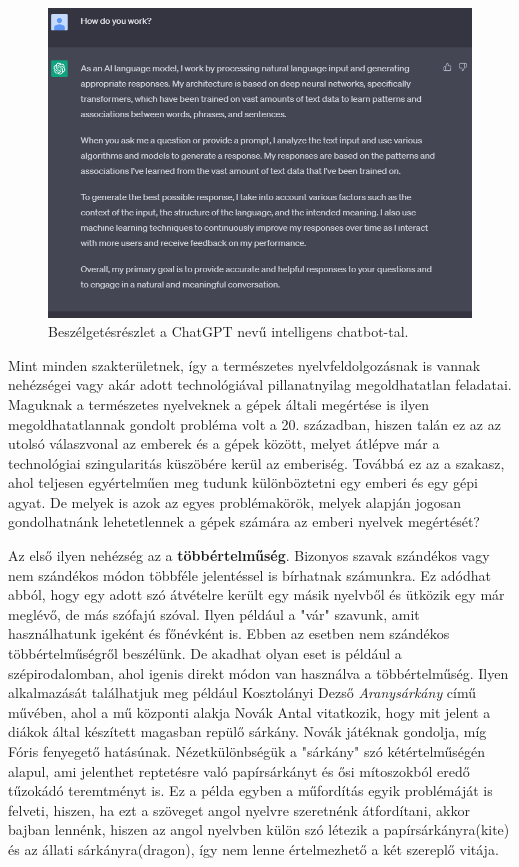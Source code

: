 \newpage

\begin{figure}[h]
\centering
\includegraphics[scale=0.6]{images/chatgpt.png}
\caption{Beszélgetésrészlet a ChatGPT nevű intelligens chatbot-tal.}
\label{fig:chatgpt}
\end{figure}


Mint minden szakterületnek, így a természetes nyelvfeldolgozásnak is vannak nehézségei vagy akár adott technológiával pillanatnyilag megoldhatatlan feladatai. Maguknak a természetes nyelveknek a gépek általi megértése is ilyen megoldhatatlannak gondolt probléma volt a 20. században, hiszen talán ez az az utolsó válaszvonal az emberek és a gépek között, melyet átlépve már a technológiai szingularitás küszöbére kerül az emberiség. Továbbá ez az a szakasz, ahol teljesen egyértelműen meg tudunk különböztetni egy emberi és egy gépi agyat. De melyek is azok az egyes problémakörök, melyek alapján jogosan gondolhatnánk lehetetlennek a gépek számára az emberi nyelvek megértését?

Az első ilyen nehézség az a \textbf{többértelműség}. Bizonyos szavak szándékos vagy nem szándékos módon többféle jelentéssel is bírhatnak számunkra. Ez adódhat abból, hogy egy adott szó átvételre került egy másik nyelvből és ütközik egy már meglévő, de más szófajú szóval. Ilyen például a "vár" szavunk, amit használhatunk igeként és főnévként is. Ebben az esetben nem szándékos többértelműségről beszélünk. De akadhat olyan eset is például a szépirodalomban, ahol igenis direkt módon van használva a többértelműség. Ilyen alkalmazását találhatjuk meg például Kosztolányi Dezső \textit{Aranysárkány} című művében, ahol a mű központi alakja Novák Antal vitatkozik, hogy mit jelent a diákok által készített magasban repülő sárkány. Novák játéknak gondolja, míg Fóris fenyegető hatásúnak. Nézetkülönbségük a "sárkány" szó kétértelműségén alapul, ami jelenthet reptetésre való papírsárkányt és ősi mítoszokból eredő tűzokádó teremtményt is. Ez a példa egyben a műfordítás egyik problémáját is felveti, hiszen, ha ezt a szöveget angol nyelvre szeretnénk átfordítani, akkor bajban lennénk, hiszen az angol nyelvben külön szó létezik a papírsárkányra(kite) és az állati sárkányra(dragon), így nem lenne értelmezhető a két szereplő vitája.

